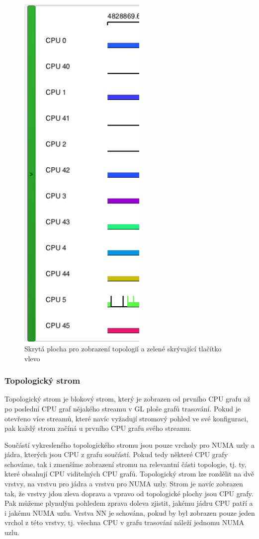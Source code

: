 \begin{figure}[p]\centering
    \includegraphics[height=180mm]{img/NUMATV/numatv-6}
    \caption{Skrytá plocha pro zobrazení topologií a zelené skrývající tlačítko vlevo}
    \label{numatv-6}
\end{figure}

\subsubsection{Topologický strom}

Topologický strom je blokový strom, který je zobrazen od prvního CPU grafu až po poslední CPU graf nějakého streamu v GL ploše grafů trasování. Pokud je otevřeno více streamů, které navíc vyžadují stromový pohled ve své konfiguraci, pak každý strom začíná u prvního CPU grafu svého streamu.

Součástí vykresleného topologického stromu jsou pouze vrcholy pro NUMA uzly a jádra, kterých jsou CPU z grafu součástí. Pokud tedy některé CPU grafy schováme, tak i zmenšíme zobrazení stromu na relevantní části topologie, tj. ty, které obsahují CPU viditelných CPU grafů. Topologický strom lze rozdělit na dvě vrstvy, na  vrstvu pro jádra a  vrstvu pro NUMA uzly. Strom je navíc zobrazen tak, že vrstvy jdou zleva doprava a vpravo od topologické plochy jsou CPU grafy. Pak můžeme plynulým pohledem zprava doleva zjistit, jakému jádru CPU patří a i jakému NUMA uzlu. Vrstva NN je schována, pokud by byl zobrazen pouze jeden vrchol z této vrstvy, tj. všechna CPU v grafu trasování náleží jednomu NUMA uzlu.

